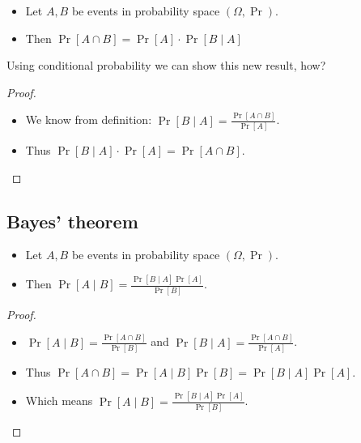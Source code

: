 \begin{frame}
  \begin{theorem}
    \begin{itemize}
      \item Let \(A, B\) be events in probability space \((\Omega, \Pr)\).
      \item Then \(\Pr[A\cap B] = \Pr[A]\cdot \Pr[B\mid A]\)
    \end{itemize}
  \end{theorem}

  \pause{}

  \begin{exercise}
    Using conditional probability we can show this new result, how?
  \end{exercise}
\end{frame}

\begin{frame}
  \begin{proof}
    \begin{itemize}
      \item We know from definition: \(\Pr[B\mid A] = \frac{\Pr[A\cap 
            B]}{\Pr[A]}\).

      \item Thus \(\Pr[B\mid A]\cdot \Pr[A] = \Pr[A\cap B]\).
    \end{itemize}
  \end{proof}
\end{frame}

\subsection{Bayes' theorem}

\begin{frame}
  \begin{theorem}
    \begin{itemize}
      \item Let \(A, B\) be events in probability space \((\Omega, \Pr)\).
      \item Then \(
          \Pr[A\mid B] = \frac{\Pr[B\mid A]\Pr[A]}{\Pr[B]}.
        \)
    \end{itemize}
  \end{theorem}

  \pause{}

  \begin{proof}
    \begin{itemize}
      \item \(\Pr[A\mid B] = \frac{\Pr[A\cap B]}{\Pr[B]}\) and \(\Pr[B\mid A] 
          = \frac{\Pr[A\cap B]}{\Pr[A]}\).

        \pause{}

      \item Thus \(\Pr[A\cap B] = \Pr[A\mid B] \Pr[B] = \Pr[B\mid A] \Pr[A]\).

        \pause{}

      \item Which means \(\Pr[A\mid B] = \frac{\Pr[B\mid A] \Pr[A]}{\Pr[B]}\).
    \end{itemize}
  \end{proof}
\end{frame}

